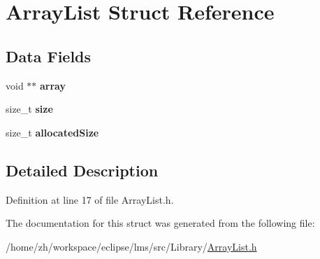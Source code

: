 \hypertarget{structArrayList}{\section{Array\-List Struct Reference}
\label{structArrayList}
}
\subsection*{Data Fields}
\begin{DoxyCompactItemize}
\item 
\hypertarget{structArrayList_a2e8a6b0eb4dda2a873616d291337fa01}{void $\ast$$\ast$ {\bfseries array}}\label{structArrayList_a2e8a6b0eb4dda2a873616d291337fa01}

\item 
\hypertarget{structArrayList_acc412139cb8cf1d2a61c5026233d7f7b}{size\-\_\-t {\bfseries size}}\label{structArrayList_acc412139cb8cf1d2a61c5026233d7f7b}

\item 
\hypertarget{structArrayList_a03abf74baef02127c297a439f825a3d5}{size\-\_\-t {\bfseries allocated\-Size}}\label{structArrayList_a03abf74baef02127c297a439f825a3d5}

\end{DoxyCompactItemize}


\subsection{Detailed Description}


Definition at line 17 of file Array\-List.\-h.



The documentation for this struct was generated from the following file\-:\begin{DoxyCompactItemize}
\item 
/home/zh/workspace/eclipse/lms/src/\-Library/\hyperlink{ArrayList_8h}{Array\-List.\-h}\end{DoxyCompactItemize}
